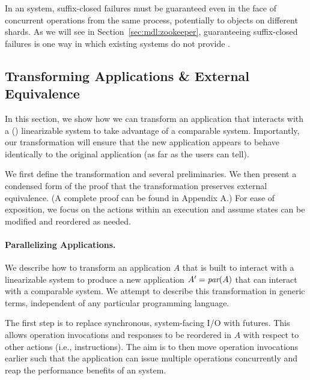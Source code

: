 In an \MDL{} system, suffix-closed failures must be guaranteed even in the
face of concurrent operations from the same process, potentially to
objects on different shards. As we will see in Section~\ref{sec:mdl:zookeeper},
guaranteeing suffix-closed failures is one way in which existing systems do not provide \mdl{}.  


\subsection{Transforming Applications \& External Equivalence}
\label{sec:mdl:equivalence}

In this section, we show how we can transform an application that interacts with
a (\singledispatch{}) linearizable system to take advantage of a comparable
\multidispatch{} system. Importantly, our transformation will ensure that the new
application appears to behave identically to the original application (as far as
the users can tell).

We first define the transformation and several preliminaries. We then
present a condensed form of the proof that the transformation preserves external
equivalence. (A complete proof can be found in Appendix A.) %
For ease of exposition, we focus on the actions within an
execution and assume states can be modified and reordered as needed.

\paragraph{Parallelizing Applications.}
\label{sec:mdl:transform}

We describe how to transform an application $A$ that is built to
interact with a linearizable system to produce a new application
$A^\prime = \operatorname*{\textit{par}}(A)$ that can interact with a comparable \MDL{} system.
We attempt to describe this transformation in generic terms, independent of any particular programming language.

The first step is to replace synchronous, system-facing I/O with
futures. This allows operation invocations and responses
to be reordered in $A$ with respect to other actions (i.e., instructions).
The aim is to then move operation invocations earlier such that the application
can issue multiple operations concurrently and reap the performance benefits 
of an \MDL{} system.

